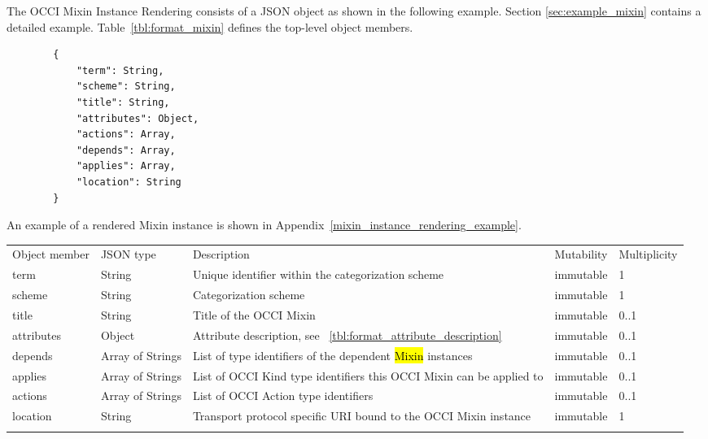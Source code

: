 \documentclass[10pt,a4paper]{article}
\begin{document}
The OCCI Mixin Instance Rendering consists of a JSON object as shown in the following example. Section \ref{sec:example_mixin} contains a detailed example.
Table~\ref{tbl:format_mixin} defines the top-level object members.

\begin{lstlisting}
        {
            "term": String,
            "scheme": String,
            "title": String,
            "attributes": Object,
            "actions": Array,
            "depends": Array,
            "applies": Array,
            "location": String
        }
\end{lstlisting}

An example of a rendered Mixin instance is shown in Appendix~\ref{mixin_instance_rendering_example}.

 {
    \begin{tabularx}{\textwidth}{llXll}
    \toprule
    Object member & JSON type & Description & Mutability & Multiplicity \\
    \colrule
    term & String & Unique identifier within the categorization scheme &
immutable & 1 \\

    scheme & String & Categorization scheme & immutable & 1 \\

    title & String & Title of the OCCI Mixin & immutable & 0..1 \\

    attributes & Object & Attribute description, see
~\ref{tbl:format_attribute_description} & immutable & 0..1 \\

    depends & Array of Strings & List of type identifiers of the dependent
 \hl{Mixin} instances & immutable & 0..1 \\

    applies & Array of Strings & List of OCCI Kind type identifiers this OCCI
Mixin can be applied to & immutable & 0..1 \\

    actions & Array of Strings & List of OCCI Action type identifiers
& immutable & 0..1 \\

    location & String & Transport protocol specific URI bound to the OCCI Mixin
instance & immutable & 1 \\
    \botrule
    \end{tabularx}
}
\end{document}
